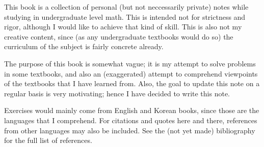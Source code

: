 
This book is a collection
of personal (but not neccessarily private) notes
while studying in undergraduate level math.
This is intended not for strictness and rigor,
although I would like to achieve that kind of skill.
This is also not my creative content,
since (as any undergraduate textbooks would do so)
the curriculum of the subject is fairly concrete already.

The purpose of this book is somewhat vague;
it is my attempt to solve problems in some textbooks,
and also an (exaggerated) attempt to comprehend viewpoints of
the textbooks that I have learned from.
Also, the goal to update this note on a regular basis
is very motivating;
hence I have decided to write this note.

Exercises would mainly come from English and Korean books,
since those are the languages that I comprehend.
For citations and quotes here and there,
references from other languages may also be included.
See the (not yet made) bibliography for the full list of references.